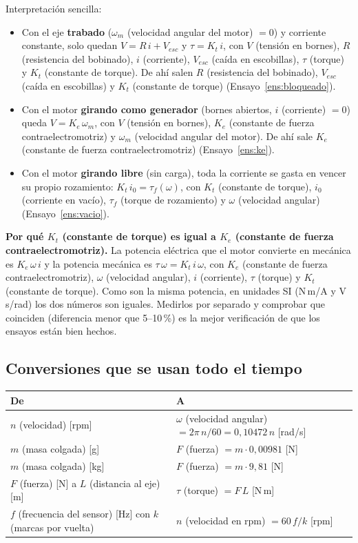 \documentclass[11pt,a4paper]{article}
\begin{document}
Interpretación sencilla:
\begin{itemize}
\item Con el eje \textbf{trabado} ($\omega_m$ (velocidad angular del motor) $= 0$) y corriente constante, solo quedan $V = R\,i + V_{esc}$ y $\tau = K_t\,i$, con $V$ (tensión en bornes), $R$ (resistencia del bobinado), $i$ (corriente), $V_{esc}$ (caída en escobillas), $\tau$ (torque) y $K_t$ (constante de torque). De ahí salen $R$ (resistencia del bobinado), $V_{esc}$ (caída en escobillas) y $K_t$ (constante de torque) (Ensayo~\ref{ens:bloqueado}).
\item Con el motor \textbf{girando como generador} (bornes abiertos, $i$ (corriente) $= 0$) queda $V = K_e\,\omega_m$, con $V$ (tensión en bornes), $K_e$ (constante de fuerza contraelectromotriz) y $\omega_m$ (velocidad angular del motor). De ahí sale $K_e$ (constante de fuerza contraelectromotriz) (Ensayo~\ref{ens:ke}).
\item Con el motor \textbf{girando libre} (sin carga), toda la corriente se gasta en vencer su propio rozamiento: $K_t\,i_0 = \tau_f(\omega)$, con $K_t$ (constante de torque), $i_0$ (corriente en vacío), $\tau_f$ (torque de rozamiento) y $\omega$ (velocidad angular) (Ensayo~\ref{ens:vacio}).
\end{itemize}

\textbf{Por qué $K_t$ (constante de torque) es igual a $K_e$ (constante de fuerza contraelectromotriz).} La potencia eléctrica que el motor convierte en mecánica es $K_e\,\omega\, i$ y la potencia mecánica es $\tau\,\omega = K_t\, i\, \omega$, con $K_e$ (constante de fuerza contraelectromotriz), $\omega$ (velocidad angular), $i$ (corriente), $\tau$ (torque) y $K_t$ (constante de torque). Como son la misma potencia, en unidades SI (N\,m/A y V\,s/rad) los dos números son iguales. Medirlos por separado y comprobar que coinciden (diferencia menor que 5--10\,\%) es la mejor verificación de que los ensayos están bien hechos.

\subsection{Conversiones que se usan todo el tiempo}

\begin{center}
\begin{tabularx}{\linewidth}{>{\raggedright\arraybackslash}X>{\raggedright\arraybackslash}X}
\toprule
De & A \\
\midrule
$n$ (velocidad) [rpm] & $\omega$ (velocidad angular) $= 2\pi\,n/60 = 0{,}10472\,n$ [rad/s] \\
$m$ (masa colgada) [g] & $F$ (fuerza) $= m \cdot 0{,}00981$ [N] \\
$m$ (masa colgada) [kg] & $F$ (fuerza) $= m \cdot 9{,}81$ [N] \\
$F$ (fuerza) [N] a $L$ (distancia al eje) [m] & $\tau$ (torque) $= F\,L$ [N\,m] \\
$f$ (frecuencia del sensor) [Hz] con $k$ (marcas por vuelta) & $n$ (velocidad en rpm) $= 60\,f/k$ [rpm] \\
\bottomrule
\end{tabularx}
\end{center}
\end{document}
